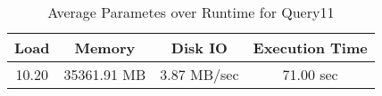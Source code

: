 \documentclass[../../main.tex]{subfiles}
\begin{document}
    \begin{table}
        \begin{center}
            \begin{tabular}{ |c|c|c|c| } 
            \hline
            Load & Memory & Disk IO & Execution Time\\
            \hline
            10.20 & 35361.91 MB & 3.87 MB/sec & 71.00 sec \\
            \hline
            \end{tabular}
            \\[1pt]
            \caption{Average Parametes over Runtime for Query11}
        \end{center}
    \end{table}
    \pagebreak
\end{document}
